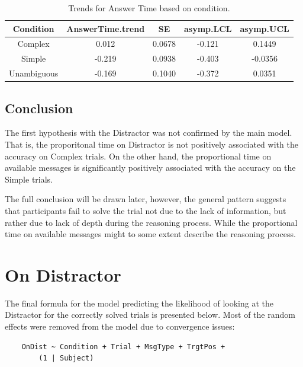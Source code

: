 \begin{table}[h!]
\centering
\begin{tabular}{|c|c|c|c|c|}
\hline
\textbf{Condition} & \textbf{AnswerTime.trend} & \textbf{SE} & \textbf{asymp.LCL} & \textbf{asymp.UCL} \\ \hline
Complex            & 0.012                     & 0.0678      & -0.121             & 0.1449             \\ \hline
Simple             & -0.219                    & 0.0938      & -0.403             & -0.0356            \\ \hline
Unambiguous        & -0.169                    & 0.1040      & -0.372             & 0.0351             \\ \hline
\end{tabular}
\caption{Trends for Answer Time based on condition.}
\label{tab:answertime_trends}
\end{table}

\subsection*{Conclusion}
The first hypothesis with the Distractor was not confirmed by the main model. That is, the proporitonal time on Distractor is not positively associated with the accuracy on Complex trials. On the other hand, the proportional time on available messages is significantly positively associated with the accuracy on the Simple trials. 

The full conclusion will be drawn later, however, the general pattern suggests that participants fail to solve the trial not due to the lack of information, but rather due to lack of depth during the reasoning process. While the proportional time on available messages might to some extent describe the reasoning process.















\section{On Distractor}
\label{sec:distractor_model}
The final formula for the model predicting the likelihood of looking at the Distractor for the correctly solved trials is presented below. Most of the random effects were removed from the model due to convergence issues:
\begin{verbatim}
    OnDist ~ Condition + Trial + MsgType + TrgtPos +
        (1 | Subject)
\end{verbatim}

